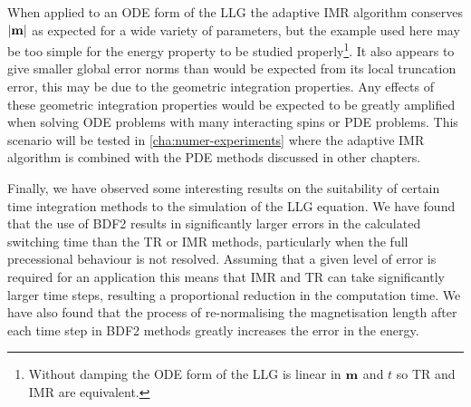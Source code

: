 When applied to an ODE form of the LLG the adaptive IMR algorithm conserves $\left|{\boldsymbol{\mathrm{m}}} \right|$ as expected for a wide variety of parameters, but the example used here may be too simple for the energy property to be studied properly\footnote{Without damping the ODE form of the LLG is linear in $\boldsymbol{\mathrm{m}}$ and $t$ so TR and IMR are equivalent.}.
It also appears to give smaller global error norms than would be expected from its local truncation error, this may be due to the geometric integration properties.
Any effects of these geometric integration properties would be expected to be greatly amplified when solving ODE problems with many interacting spins or PDE problems.
This scenario will be tested in \cref{cha:numer-experiments} where the adaptive IMR algorithm is combined with the PDE methods discussed in other chapters.

Finally, we have observed some interesting results on the suitability of certain time integration methods to the simulation of the LLG equation.
We have found that the use of BDF2 results in significantly larger errors in the calculated switching time than the TR or IMR methods, particularly when the full precessional behaviour is not resolved.
Assuming that a given level of error is required for an application this means that IMR and TR can take significantly larger time steps, resulting a proportional reduction in the computation time.
We have also found that the process of re-normalising the magnetisation length after each time step in BDF2 methods greatly increases the error in the energy.


